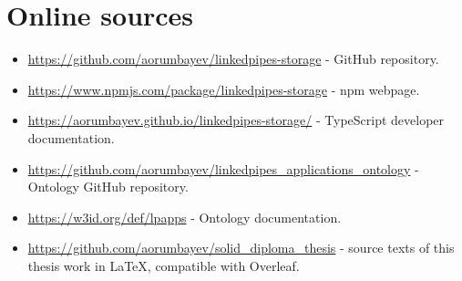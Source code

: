 \chapter{Online sources}
\label{att:online-sources}

\begin{itemize}
  \item \url{https://github.com/aorumbayev/linkedpipes-storage} - \lpas{} GitHub repository.
  \item \url{https://www.npmjs.com/package/linkedpipes-storage} - \lpas{} npm \newline{} webpage.
  \item \url{https://aorumbayev.github.io/linkedpipes-storage/} - \lpas{} TypeScript developer documentation.
  \item \url{https://github.com/aorumbayev/linkedpipes_applications_ontology} - \lpas{} Ontology GitHub repository.
  \item \url{https://w3id.org/def/lpapps} - \lpas{} Ontology documentation.
  \item \url{https://github.com/aorumbayev/solid_diploma_thesis} - source texts of this thesis work in LaTeX, compatible with Overleaf.
  \end{itemize}